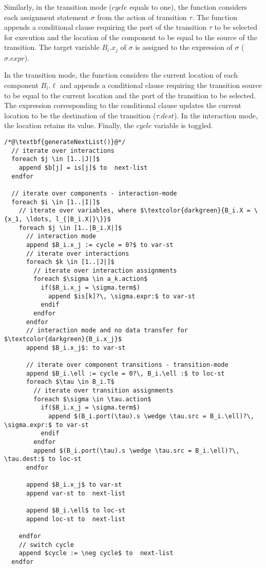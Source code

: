 Similarly, in the transition mode ($cycle$ equals to one), the function considers each assignment statement $\sigma$ from the action of transition $\tau$. The function appends a conditional clause requiring the port of the transition $\tau$ to be selected for execution and the location of the component to be equal to the source of the transition. The target variable $B_i.x_j$ of $\sigma$ is assigned to the expression of $\sigma$ ($\sigma.expr$). 

In the transition mode, the function considers the current location of each component $B_i.\ell$ and appends a conditional clause requiring the transition source to be equal to the current location and the port of the transition to be selected. The expression corresponding to the conditional clause updates the current location to be the destination of the transition ($\tau.dest$).  In the interaction mode, the location retains its value. Finally, the $cycle$ variable is toggled. 

\begin{lstlisting}
/*@\textbf{generateNextList()}@*/ 
  // iterate over interactions
  foreach $j \in [1..|J|]$ 
    append $b[j] = is[j]$ to  next-list 
  endfor

  // iterate over components - interaction-mode
  foreach $i \in [1..|I|]$ 
    // iterate over variables, where $\textcolor{darkgreen}{B_i.X = \{x_1, \ldots, l_{|B_i.X|}\}}$ 
    foreach $j \in [1..|B_i.X|]$ 
      // interaction mode
      append $B_i.x_j := cycle = 0?$ to var-st
      // iterate over interactions
      foreach $k \in [1..|J|]$ 
        // iterate over interaction assignments
        foreach $\sigma \in a_k.action$
          if($B_i.x_j = \sigma.term$)
            append $is[k]?\, \sigma.expr:$ to var-st
          endif
        endfor
      endfor
      // interaction mode and no data transfer for $\textcolor{darkgreen}{B_i.x_j}$
      append $B_i.x_j$: to var-st 
      
      // iterate over component transitions - transition-mode
      append $B_i.\ell := cycle = 0?\, B_i.\ell :$ to loc-st
      foreach $\tau \in B_i.T$ 
        // iterate over transition assignments
        foreach $\sigma \in \tau.action$
          if($B_i.x_j = \sigma.term$)
            append $(B_i.port(\tau).s \wedge \tau.src = B_i.\ell)?\, \sigma.expr:$ to var-st 
          endif
        endfor
        append $(B_i.port(\tau).s \wedge \tau.src = B_i.\ell)?\, \tau.dest:$ to loc-st 
      endfor  
      
      append $B_i.x_j$ to var-st 
      append var-st to  next-list 
      
      append $B_i.\ell$ to loc-st 
      append loc-st to  next-list 

    endfor
    // switch cycle
    append $cycle := \neg cycle$ to  next-list 
  endfor
\end{lstlisting}



